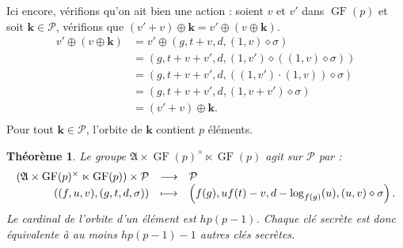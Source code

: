\documentclass[a4paper, titlepage]{article}
\newtheorem{theo}{Théorème}[section]
\theoremstyle{definition}
\theoremstyle{remark}
\def\gf{\operatorname{GF}}
\begin{document}
Ici encore, vérifions qu'on ait bien une action : soient $v$ et $v'$ dans $\gf(p)$ et soit $\mathbf{k} \in \mathcal{P}$, vérifions que $(v'+v)\oplus\mathbf{k} = v'\oplus(v\oplus\mathbf{k})$.
\begin{align*}
v'\oplus(v\oplus\mathbf{k}) &= v'\oplus(g,t + v,d,(1,v)\diamond\sigma) \\
&= (g,t+v+v',d,(1,v')\diamond((1,v)\diamond\sigma)) \\
&= (g,t+v+v',d,((1,v')\cdot(1,v))\diamond\sigma) \\
&= (g,t+v+v', d,(1,v + v')\diamond\sigma) \\
&= (v'+v)\oplus\mathbf{k}.\\
\end{align*} 
Pour tout $\mathbf{k} \in \mathcal{P}$, l'orbite de $\mathbf{k}$ contient $p$ éléments.\\

\begin{theo}
Le groupe $\mathfrak{A} \times \gf(p)^\times \ltimes \gf(p)$ agit sur $\mathcal{P}$ par :
$$\begin{array}{r c l}
(\mathfrak{A} \times \gf(p)^\times \ltimes \gf(p)) \times \mathcal{P}& \longrightarrow& \mathcal{P} \\
\left((f,u,v), \left(g,t,d,\sigma \right)\right)& \longmapsto&  \left(f(g), uf(t)-v,d-\log_{f(g)}(u),(u,v)\diamond\sigma \right).
\end{array}$$
Le cardinal de l'orbite d'un élément est $hp(p-1)$. Chaque clé secrète est donc équivalente à au moins $hp(p-1) -1$ autres clés secrètes.
\end{theo}
\end{document}
